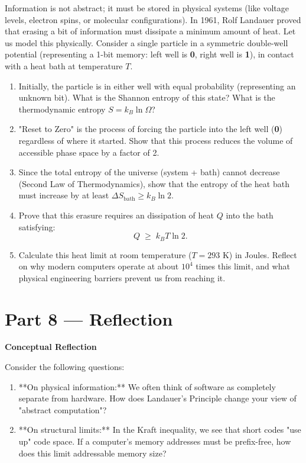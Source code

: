 \begin{deepproblem}
Information is not abstract; it must be stored in physical systems (like voltage levels, electron spins, or molecular configurations).
In 1961, Rolf Landauer proved that erasing a bit of information must dissipate a minimum amount of heat. Let us model this physically.
Consider a single particle in a symmetric double-well potential (representing a 1-bit memory: left well is \textbf{0}, right well is \textbf{1}), in contact with a heat bath at temperature $T$.
\begin{enumerate}[label=(\alph*)]
  \item Initially, the particle is in either well with equal probability (representing an unknown bit). What is the Shannon entropy of this state? What is the thermodynamic entropy $S = k_B \ln \Omega$?
  \item "Reset to Zero" is the process of forcing the particle into the left well (\textbf{0}) regardless of where it started. Show that this process reduces the volume of accessible phase space by a factor of 2.
  \item Since the total entropy of the universe (system + bath) cannot decrease (Second Law of Thermodynamics), show that the entropy of the heat bath must increase by at least $\Delta S_{\text{bath}} \ge k_B \ln 2$.
  \item Prove that this erasure requires an dissipation of heat $Q$ into the bath satisfying:
  \[
    Q \;\ge\; k_B T \ln 2.
  \]
  \item Calculate this heat limit at room temperature ($T = 293$ K) in Joules. Reflect on why modern computers operate at about $10^4$ times this limit, and what physical engineering barriers prevent us from reaching it.
\end{enumerate}
\end{deepproblem}

\bigskip

\section{Part 8 \texorpdfstring{---}{--} Reflection}

\begin{reflectionbox}
\textbf{Conceptual Reflection}

Consider the following questions:
\begin{enumerate}
  \item **On physical information:** We often think of software as completely separate from hardware. How does Landauer's Principle change your view of "abstract computation"?
  \item **On structural limits:** In the Kraft inequality, we see that short codes "use up" code space. If a computer's memory addresses must be prefix-free, how does this limit addressable memory size?
\end{enumerate}
\end{reflectionbox}


